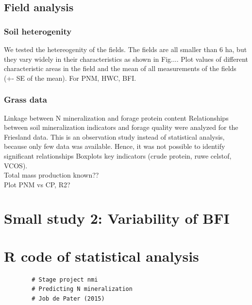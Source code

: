 \documentclass[10pt,twoside,dutch,english]{report}
\begin{document}
\begin{appendices}
			\section{Field analysis}
		
			\subsection{Soil heterogenity}
			We tested the hetereogenity of the fields. The fields are all smaller than 6 ha, but they vary widely in their characteristics as shown in Fig....
			Plot values of different characteristic areas in the field and the mean of all measurements of the fields (+- SE of the mean). For PNM, HWC, BFI.
			\subsection{Grass data}
			Linkage between N mineralization and forage protein content
	Relationships between soil mineralization indicators and forage quality were analyzed for the Friesland data.  This is an observation study instead of statistical analysis, because only few data was available. Hence, it was not possible to identify significant relationships
	Boxplots key indicators (crude protein, ruwe celstof, VCOS).\\
	Total mass production known??\\
	Plot PNM vs CP, R2?

\chapter{Small study 2: Variability of BFI}
		\label{chap:study2}
		
		
		\chapter{R code of statistical analysis} %
		\begin{verbatim}
		# Stage project nmi
		# Predicting N mineralization
		# Job de Pater (2015)
		
		
		\end{verbatim}
\end{appendices}



    
\end{document}
